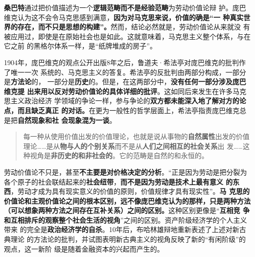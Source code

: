 \textbf{桑巴特}通过把价值描述为一个\textbf{逻辑范畴而不是经验范畴}为劳动价值论辩
护。庞巴维克认为这不会令马克思感到满意，\textbf{因为对马克思来说，价值的确是“一
  种真实世界的存在，而不只是思想的构建”。}然而，结论必然就是，劳动价值论从来就没
有被应用过，即使是在原始社会也是如此。这就意味着，马克思主义整个体系，与在它之前
的黑格尔体系一样，是“纸牌堆成的房子”。

1904年，庞巴维克的观点公开出版8年之后，鲁道夫·希法亭对庞巴维克的批判作了唯一一次
系统的、马克思主义的答复。希法亭的反批判由两部分构成，一部分是\textbf{方法论}的，
一部分是\textbf{历史}的。但是，在这两部分中，\textbf{没有任何一部分涉及庞巴维克提
  出来用以反对劳动价值论的具体详细的批评}。这如同后来发生在许多马克思主义政治经济
学领域的争论一样，参与争论的\textbf{双方都未能深入地了解对方的论点，而且缺乏真正
  的对话。}在更为一般性的哲学层面上，希法亭指责庞巴维克总是把\textbf{自然现象和社
  会现象混为一谈}。
\begin{quotation}
  每一种从使用价值出发的价值理论，也就是说从事物的\textbf{自然属性}出发的价值
  理论……是从\textbf{物与人的个别关系}而不是从\textbf{人们之间相互的社会关系}出
  发……这种视角是\textbf{非历史的和非社会的}。它的范畴是自然的和永恒的。
\end{quotation}

劳动价值论不只是，甚至\textbf{不主要是对价格决定的分析}。“正是因为劳动是把分裂为
各个原子的社会联结起来的\textbf{社会纽带}，\textbf{而不是因为劳动是技术上最有意义
  的东西}，劳动才成为具有现实意义的价值的原则，价值规律才具有现实性”。\textbf{马
  克思的价值论和主观价值论之间的根本区别，远不像庞巴维克认为的那样，只是两种方法
  （可以想象两种方法之间存在互补关系）之间的区别。}这种区别更像是“\textbf{互相竞
  争和互相排斥的观察整个社会生活的视角}”之间的区别。资产阶级经济学的个人主义带来
的完全是\textbf{政治经济学的自杀}。10年后，布哈林雄辩地重新表述了上述对新古典理论
的方法论的批判，并试图表明新古典主义的视角反映了新的“有闲阶级”的观点，这一新阶
级是随着金融资本的兴起而产生的。

